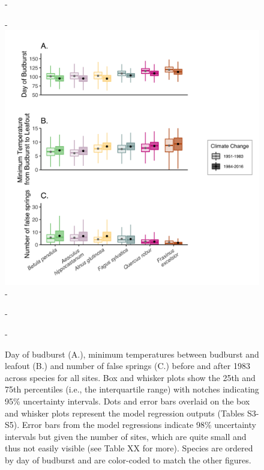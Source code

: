 \documentclass{article}\usepackage[]{graphicx}\usepackage[]{color}
\begin{document}
{\begin{figure} [H]
  -\begin{center}
  -\includegraphics[width=14cm]{..//analyses/figures/Boxplot_BBTminFS_noDots_modests.png}
  -\caption{Day of budburst (A.), minimum temperatures between budburst and leafout (B.) and number of false springs (C.) before and after 1983 across species for all sites. Box and whisker plots show the 25th and 75th percentiles (i.e., the interquartile range) with notches indicating 95\% uncertainty intervals. Dots and error bars overlaid on the box and whisker plots represent the model regression outputs (Tables S3-S5). Error bars from the model regressions indicate 98\% uncertainty intervals but given the number of sites, which are quite small and thus not easily visible (see Table XX for more). Species are ordered by day of budburst and are color-coded to match the other figures.  }\label{fig:boxfs}
  -\end{center}
  -\end{figure}}
  
\end{document}
